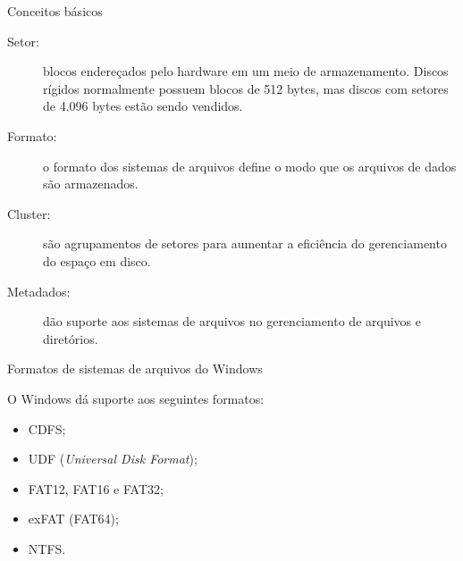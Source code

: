 
\begin{frame}{Conceitos básicos}
  \begin{description}
  \item[Setor:] blocos endereçados pelo hardware em um meio de
    armazenamento. Discos rígidos normalmente possuem blocos de 512
    bytes, mas discos com setores de 4.096 bytes estão sendo vendidos.\pause
  \item[Formato:] o formato dos sistemas de arquivos define o modo que 
    os arquivos de dados são armazenados. \pause
  \item[Cluster:] são agrupamentos de setores para aumentar a eficiência 
    do gerenciamento do espaço em disco.\pause
  \item[Metadados:] dão suporte aos sistemas de arquivos no gerenciamento 
    de arquivos e diretórios.
  \end{description}
\end{frame}

\begin{frame}{Formatos de sistemas de arquivos do Windows}
  
  O Windows dá suporte aos seguintes formatos:

  \begin{itemize}
  \item CDFS;
  \item UDF ({\em Universal Disk Format});
  \item FAT12, FAT16 e FAT32;
  \item exFAT (FAT64);
  \item NTFS.
  \end{itemize}
\end{frame}

